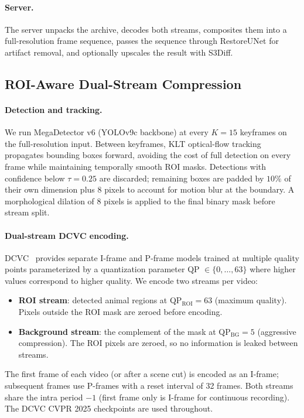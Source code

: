 \documentclass[10pt, conference]{IEEEtran}
\begin{document}
\paragraph{Server.} The server unpacks the archive, decodes both streams, composites them into a full-resolution frame sequence, passes the sequence through RestoreUNet for artifact removal, and optionally upscales the result with S3Diff.

\subsection{ROI-Aware Dual-Stream Compression}
\label{ssec:compression}

\paragraph{Detection and tracking.}
We run MegaDetector v6 (YOLOv9c backbone) at every $K{=}15$ keyframes on the full-resolution input. Between keyframes, KLT optical-flow tracking~\cite{Lucas_1981_KLT} propagates bounding boxes forward, avoiding the cost of full detection on every frame while maintaining temporally smooth ROI masks. Detections with confidence below $\tau{=}0.25$ are discarded; remaining boxes are padded by $10\%$ of their own dimension plus 8 pixels to account for motion blur at the boundary. A morphological dilation of 8 pixels is applied to the final binary mask before stream split.

\paragraph{Dual-stream DCVC encoding.}
DCVC~\cite{Li_2023_DCVC} provides separate I-frame and P-frame models trained at multiple quality points parameterized by a quantization parameter QP $\in \{0, \ldots, 63\}$ where higher values correspond to higher quality. We encode two streams per video:
\begin{itemize}
    \item \textbf{ROI stream}: detected animal regions at QP$_{\text{ROI}} {=} 63$ (maximum quality). Pixels outside the ROI mask are zeroed before encoding.
    \item \textbf{Background stream}: the complement of the mask at QP$_{\text{BG}} {=} 5$ (aggressive compression). The ROI pixels are zeroed, so no information is leaked between streams.
\end{itemize}
The first frame of each video (or after a scene cut) is encoded as an I-frame; subsequent frames use P-frames with a reset interval of 32 frames. Both streams share the intra period $-1$ (first frame only is I-frame for continuous recording). The DCVC CVPR 2025 checkpoints are used throughout.
\end{document}

